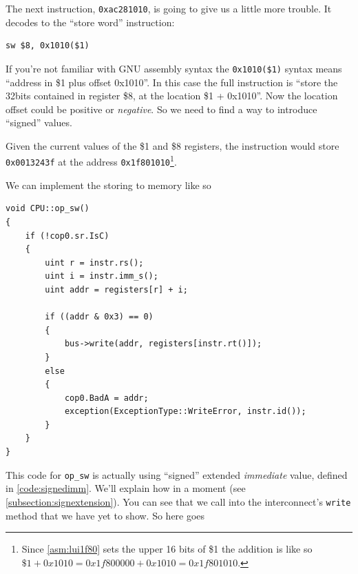 \documentclass[a4paper]{article}
\newcommand{\code}[1] {\texttt{#1}}
\begin{document}
The next instruction, \code{0xac281010}, is going to give us a
little more trouble. It decodes to the ``store word'' instruction:

\begin{lstlisting}[language=assembly]
sw $8, 0x1010($1)
\end{lstlisting}

If you're not familiar with GNU assembly syntax the
\code{0x1010(\$1)} syntax means ``address in \$1 plus offset
0x1010''. In this case the full instruction is ``store the 32bits contained
in register \$8, at the location \$1 + 0x1010''. Now the location offset could be positive
or \emph{negative}.  So we need to find a way to introduce ``signed'' values.

Given the current values of the \$1 and \$8 registers, the instruction would store
\code{0x0013243f} at the address \code{0x1f801010}\footnote{Since \ref{asm:lui1f80} sets the
upper 16 bits of \$1 the addition is like so $\$1+0x1010=0x1f800000+0x1010=0x1f801010$.}.

We can implement the storing to memory like so

\begin{lstlisting}
void CPU::op_sw()
{
	if (!cop0.sr.IsC)
	{
		uint r = instr.rs();
		uint i = instr.imm_s();
		uint addr = registers[r] + i;

		if ((addr & 0x3) == 0)
		{
			bus->write(addr, registers[instr.rt()]);
		}
		else
		{
			cop0.BadA = addr;
			exception(ExceptionType::WriteError, instr.id());
		}
	}
}
\end{lstlisting}

This code for \code{op\_sw} is actually using ``signed'' extended \emph{immediate} value,
defined in \ref{code:signedimm}.
We'll explain how in a moment (see \ref{subsection:signextension}).  You can see that we
call into the interconnect's \code{write} method that we have yet to show. So here goes
\end{document}
